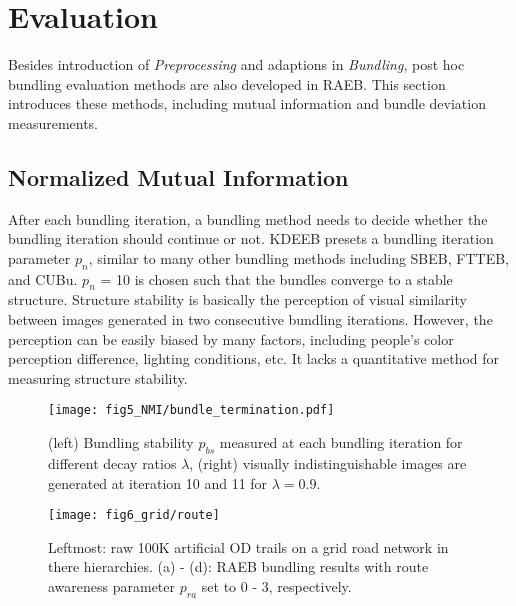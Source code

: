 \section{Evaluation}
\label{sec:eva}

Besides introduction of \textit{Preprocessing} and adaptions in \textit{Bundling}, post hoc bundling evaluation methods are also developed in RAEB.
This section introduces these methods, including mutual information and bundle deviation measurements.

\subsection{Normalized Mutual Information}
After each bundling iteration, a bundling method needs to decide whether the bundling iteration should continue or not.
KDEEB presets a bundling iteration parameter $p_n$, similar to many other bundling methods including SBEB, FTTEB, and CUBu.
$p_n$ = 10 is chosen such that the bundles converge to a stable structure.
Structure stability is basically the perception of visual similarity between images generated in two consecutive bundling iterations.
However, the perception can be easily biased by many factors, including people's color perception difference, lighting conditions, etc.
It lacks a quantitative method for measuring structure stability.

\begin{figure}[t]
	\centering
	\texttt{[image: fig5\_NMI/bundle\_termination.pdf]}
	\vspace{-5mm}
	\caption{(left) Bundling stability $p_{bs}$ measured at each bundling iteration for different decay ratios $\lambda$, (right) visually indistinguishable images are generated at iteration 10 and 11 for $\lambda=0.9$.}
	\label{fig:nmi}
	\vspace{-4mm}
\end{figure}

\begin{figure*}[t]
	\centering
	\texttt{[image: fig6\_grid/route]}
	\vspace{-4mm}
	\caption{
		Leftmost: raw 100K artificial OD trails on a grid road network in there hierarchies. 
		(a) - (d): RAEB bundling results with route awareness parameter $p_{ra}$ set to 0 - 3, respectively.
		}
	\label{fig:grid}
	\vspace{-4mm}
\end{figure*}

